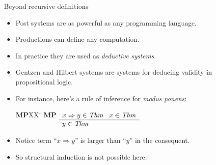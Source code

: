 \documentclass[style=sailor,size=12pt]{powerdot}
\newcommand{\id}[1]{\mbox{\it #1\/}}
\begin{document}
\begin{wideslide}[bm=,toc=]{Beyond recursive definitions}
\begin{itemize}
\item Post systems are as powerful as any programming language.
\item Productions can define any computation.
\item In practice they are used as {\em deductive systems\/}.
\item Gentzen and Hilbert systems are systems for deducing validity in propositional logic.
\item For instance, here's a rule of inference for {\em modus ponens\/}:
\vspace{-1em}
\begin{tabbing}
{\bf MP}XX \=  \kill
{\bf MP} \>
        \(\begin{array}[t]{l}
        x\Rightarrow y \in\id{Thm}\;\;\;x\in\id{Thm} \\
        \hline
        y\in\id{Thm}
        \end{array}\)
\end{tabbing}
\item Notice term ``$x\Rightarrow y$'' is larger than ``$y$'' in the consequent.
\item So structural induction is not possible here.
\end{itemize}
\end{wideslide}
\end{document}
